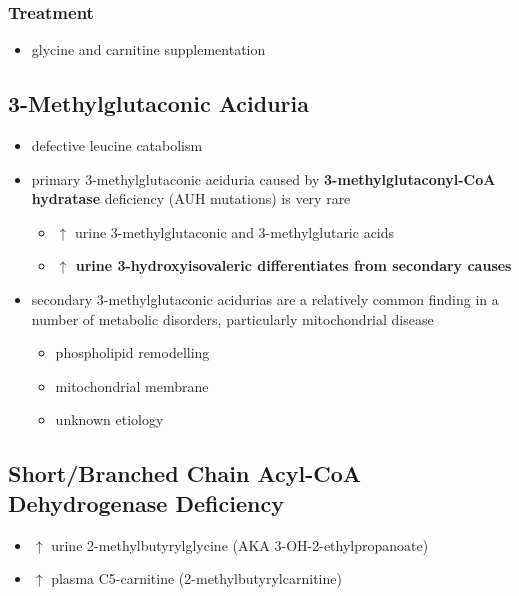\documentclass[12pt]{scrartcl}
\begin{document}
\subsubsection{Treatment}
\label{sec:org510bf79}
\begin{itemize}
\item glycine and carnitine supplementation
\end{itemize}

\subsection{3-Methylglutaconic Aciduria}
\label{sec:orgc80da5b}
\begin{itemize}
\item defective leucine catabolism
\item primary 3-methylglutaconic aciduria caused by \textbf{3-methylglutaconyl-CoA}
\textbf{hydratase} deficiency (AUH mutations) is very rare
\begin{itemize}
\item \(\uparrow\) urine 3-methylglutaconic and 3-methylglutaric acids
\item \textbf{\(\uparrow\) urine 3-hydroxyisovaleric differentiates from secondary causes}
\end{itemize}
\end{itemize}


\begin{itemize}
\item secondary 3-methylglutaconic acidurias are a relatively common finding in a
number of metabolic disorders, particularly mitochondrial disease
\begin{itemize}
\item phospholipid remodelling
\item mitochondrial membrane
\item unknown etiology
\end{itemize}
\end{itemize}

\subsection{Short/Branched Chain Acyl-CoA Dehydrogenase Deficiency}
\label{sec:orgd5505c3}
\begin{itemize}
\item \(\uparrow\)  urine 2-methylbutyrylglycine (AKA 3-OH-2-ethylpropanoate)
\item \(\uparrow\)  plasma C5-carnitine (2-methylbutyrylcarnitine)
\end{itemize}
\end{document}
